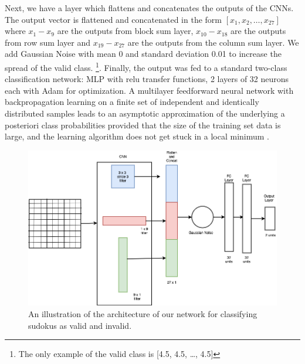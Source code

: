 \documentclass[twoside]{article}
\begin{document}
Next, we have a layer which flattens and concatenates the outputs of the CNNs. The output vector is flattened and concatenated in the form $[x_1, x_2, …, x_{27}]$ where $x_1-x_9$ are the outputs from block sum layer, $x_{10}-x_{18}$ are the outputs from row sum layer and $x_{19}-x_{27}$ are the outputs from the column sum layer.
We add Gaussian Noise with mean 0 and standard deviation 0.01 to increase the spread of the valid class. \footnote{The only example of the valid class is [4.5, 4.5, …, 4.5]}. Finally, the output was fed to a standard two-class classification network: MLP with relu transfer functions, 2 layers of 32 neurons each with Adam for optimization. A multilayer feedforward neural network with backpropagation learning on a finite set of independent and identically distributed samples leads to an asymptotic approximation of the underlying a posteriori class probabilities provided that the size of the training set data is large, and the learning algorithm does not get stuck in a local minimum \cite{hampshire}.\\

\begin{figure}
  \centering
  \includegraphics[width=\textwidth]{cnn_fixed_weights.png}
  \caption{An illustration of the architecture of our network for classifying sudokus as valid and invalid.}
  \label{fig:model}
\end{figure}

\end{document}
